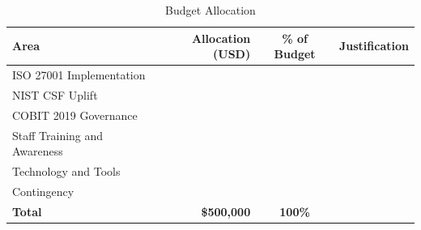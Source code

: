 \begin{table}[H]

\centering

\caption{Budget Allocation}

\label{tab:budget}

\begin{tabularx}{\textwidth}{
X
r
c
X
}

\toprule

Area &
Allocation (USD) &
\% of Budget &
Justification \\

\midrule

ISO 27001 Implementation & & & \\

NIST CSF Uplift & & & \\

COBIT 2019 Governance & & & \\

Staff Training and Awareness & & & \\

Technology and Tools & & & \\

Contingency & & & \\

\midrule

\textbf{Total} & \textbf{\$500,000} & \textbf{100\%} & \\

\bottomrule

\end{tabularx}

\end{table}
